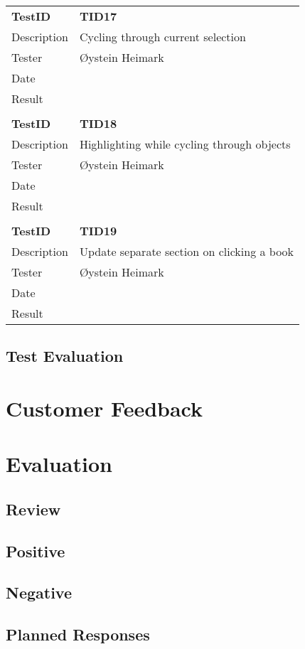 \begin{table}
\begin{tabular}{ l p{13cm} }
\bf{TestID}		&\bf{TID17}			\\
Description	&Cycling through current selection	\\
Tester		&Øystein Heimark	\\
Date			&	\\
Result		&		\\
\hline \\ [-2.0ex]

\bf{TestID}		&\bf{TID18}			\\
Description	&Highlighting while cycling through objects	\\
Tester		&Øystein Heimark	\\
Date			&	\\
Result		&	\\
\hline \\ [-2.0ex]

\bf{TestID}		&\bf{TID19}			\\
Description	&Update separate section on clicking a book	\\
Tester		&Øystein Heimark	\\
Date			&	\\
Result		&		\\
\hline

\end{tabular}
\label{table:sp2testresults}
\end{table}

\subsection{Test Evaluation}
\section{Customer Feedback}
\section{Evaluation}
\subsection{Review}
\subsection{Positive}
\subsection{Negative}
\subsection{Planned Responses}
